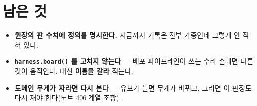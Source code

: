 \documentclass[11pt]{article}
\begin{document}
\section*{남은 것}

\begin{itemize}
\item \textbf{원장의 판 수치에 정의를 명시한다.} 지금까지 기록은 전부 가중인데
그렇게 안 적혀 있다.
\item \textbf{\texttt{harness.board()} 를 고치지 않는다} --- 배포 파이프라인이
쓰는 수라 손대면 다른 것이 움직인다. 대신 \textbf{이름을 갈라} 적는다.
\item \textbf{도메인 무게가 자라면 다시 본다} --- 유보가 늘면 무게가 바뀌고,
그러면 이 판정도 다시 재야 한다(노트 406 계열 조항).
\end{itemize}
\end{document}
